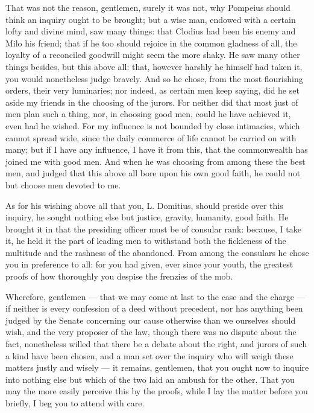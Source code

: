  That was not the reason, gentlemen, surely it was not, why Pompeius should think an inquiry ought to be brought; but a wise man, endowed with a certain lofty and divine mind, saw many things: that Clodius had been his enemy and Milo his friend; that if he too should rejoice in the common gladness of all, the loyalty of a reconciled goodwill might seem the more shaky. He saw many other things besides, but this above all: that, however harshly he himself had taken it, you would nonetheless judge bravely. And so he chose, from the most flourishing orders, their very luminaries; nor indeed, as certain men keep saying, did he set aside my friends in the choosing of the jurors. For neither did that most just of men plan such a thing, nor, in choosing good men, could he have achieved it, even had he wished. For my influence is not bounded by close intimacies, which cannot spread wide, since the daily commerce of life cannot be carried on with many; but if I have any influence, I have it from this, that the commonwealth has joined me with good men. And when he was choosing from among these the best men, and judged that this above all bore upon his own good faith, he could not but choose men devoted to me.

 As for his wishing above all that you, L. Domitius, should preside over this inquiry, he sought nothing else but justice, gravity, humanity, good faith. He brought it in that the presiding officer must be of consular rank: because, I take it, he held it the part of leading men to withstand both the fickleness of the multitude and the rashness of the abandoned. From among the consulars he chose you in preference to all: for you had given, ever since your youth, the greatest proofs of how thoroughly you despise the frenzies of the mob.

 Wherefore, gentlemen --- that we may come at last to the case and the charge --- if neither is every confession of a deed without precedent, nor has anything been judged by the Senate concerning our cause otherwise than we ourselves should wish, and the very proposer of the law, though there was no dispute about the fact, nonetheless willed that there be a debate about the right, and jurors of such a kind have been chosen, and a man set over the inquiry who will weigh these matters justly and wisely --- it remains, gentlemen, that you ought now to inquire into nothing else but which of the two laid an ambush for the other. That you may the more easily perceive this by the proofs, while I lay the matter before you briefly, I beg you to attend with care.

